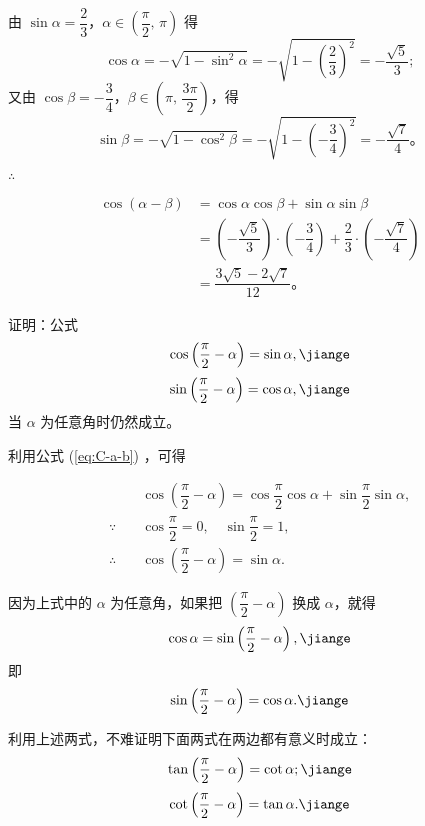 \jie 由 $\sin\alpha = \dfrac 2 3$，$\alpha \in \left( \dfrac \pi 2, \, \pi \right)$ 得
$$\cos\alpha = -\sqrt{1 - \sin^2 \alpha} = -\sqrt{1 - \left( \dfrac 2 3 \right)^2} = -\dfrac{\sqrt 5}{3};$$
又由 $\cos\beta = -\dfrac 3 4$，$\beta \in \left( \pi, \, \dfrac{3\pi}{2} \right)$，得
$$\sin\beta = -\sqrt{1 - \cos^2 \beta} = -\sqrt{1 - \left( -\dfrac 3 4 \right)^2} = -\dfrac{\sqrt 7}{4} \text{。}$$

$\therefore$ \begin{minipage}[t]{9cm}
    \vspace{-1.7em}
    \begin{align*}
        \cos(\alpha - \beta) &= \cos\alpha \cos\beta + \sin\alpha \sin\beta \\
            &= \left( -\dfrac{\sqrt 5}{3} \right) \cdot \left( -\dfrac 3 4 \right) + \dfrac 2 3 \cdot \left( -\dfrac{\sqrt 7}{4} \right) \\
            &= \dfrac{3\sqrt 5 - 2\sqrt 7}{12} \text{。}
    \end{align*}
\end{minipage}

\jiange
\liti 证明：公式
$$\cos\left( \dfrac \pi 2 - \alpha \right) = \sin\alpha , \jiange$$
$$\sin\left( \dfrac \pi 2 - \alpha \right) = \cos\alpha , \jiange$$
当 $\alpha$ 为任意角时仍然成立。

\zhengming 利用公式 (\ref{eq:C-a-b}) ，可得

\begin{minipage}{20em}
    \begin{align*}
        & \cos\left( \dfrac \pi 2 - \alpha \right) = \cos\dfrac \pi 2 \cos\alpha + \sin\dfrac \pi 2 \sin\alpha,\\
        \because \quad & \cos\dfrac \pi 2 = 0, \quad \sin\dfrac \pi 2 = 1, \\
        \therefore \quad & \cos\left( \dfrac \pi 2 - \alpha \right) = \sin\alpha.
    \end{align*}
\end{minipage}

因为上式中的 $\alpha$ 为任意角，如果把 $\left( \dfrac \pi 2 - \alpha \right)$ 换成 $\alpha$，就得
$$\cos\alpha = \sin\left( \dfrac \pi 2 - \alpha \right), \jiange $$
即
\vspace{-1.2em}$$\sin\left( \dfrac \pi 2 - \alpha \right) = \cos\alpha . \jiange$$

利用上述两式，不难证明下面两式在两边都有意义时成立：
$$\tan\left( \dfrac \pi 2 - \alpha \right) = \cot\alpha ; \jiange$$
$$\cot\left( \dfrac \pi 2 - \alpha \right) = \tan\alpha . \jiange$$

